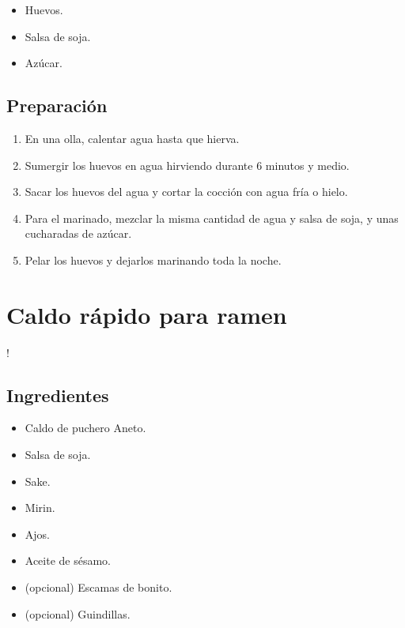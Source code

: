 \documentclass[
]{book}
\providecommand{\tightlist}{%
  \setlength{\itemsep}{0pt}\setlength{\parskip}{0pt}}
\begin{document}
\begin{itemize}
\tightlist
\item
  Huevos.
\item
  Salsa de soja.
\item
  Azúcar.
\end{itemize}

\hypertarget{preparaciuxf3n-7}{%
\section*{Preparación}\label{preparaciuxf3n-7}}

\begin{enumerate}
\def\labelenumi{\arabic{enumi}.}
\tightlist
\item
  En una olla, calentar agua hasta que hierva.
\item
  Sumergir los huevos en agua hirviendo durante 6 minutos y medio.
\item
  Sacar los huevos del agua y cortar la cocción con agua fría o hielo.
\item
  Para el marinado, mezclar la misma cantidad de agua y salsa de soja, y unas cucharadas de azúcar.
\item
  Pelar los huevos y dejarlos marinando toda la noche.
\end{enumerate}

\hypertarget{caldo-ruxe1pido-para-ramen}{%
\chapter{Caldo rápido para ramen}\label{caldo-ruxe1pido-para-ramen}}

!

\hypertarget{ingredientes-8}{%
\section*{Ingredientes}\label{ingredientes-8}}

\begin{itemize}
\tightlist
\item
  Caldo de puchero Aneto.
\item
  Salsa de soja.
\item
  Sake.
\item
  Mirin.
\item
  Ajos.
\item
  Aceite de sésamo.
\item
  (opcional) Escamas de bonito.
\item
  (opcional) Guindillas.
\end{itemize}
\end{document}
